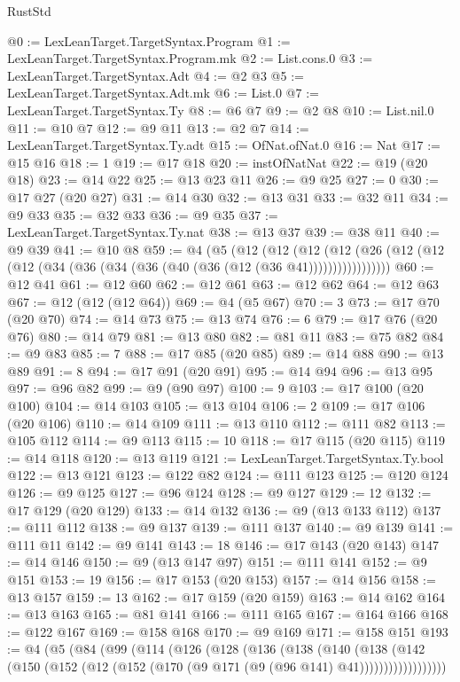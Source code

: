 \begin{lexlean}{RustStd}
\begin{coremodule}
{\begin{coremodule}
{{{{{{{{{{{{{{{{{{{{{{{{{{{{{{{{@0 := LexLeanTarget.TargetSyntax.Program
@1 := LexLeanTarget.TargetSyntax.Program.mk
@2 := List.cons.{0}
@3 := LexLeanTarget.TargetSyntax.Adt
@4 := @2 @3
@5 := LexLeanTarget.TargetSyntax.Adt.mk
@6 := List.{0}
@7 := LexLeanTarget.TargetSyntax.Ty
@8 := @6 @7
@9 := @2 @8
@10 := List.nil.{0}
@11 := @10 @7
@12 := @9 @11
@13 := @2 @7
@14 := LexLeanTarget.TargetSyntax.Ty.adt
@15 := OfNat.ofNat.{0}
@16 := Nat
@17 := @15 @16
@18 := 1
@19 := @17 @18
@20 := instOfNatNat
@22 := @19 (@20 @18)
@23 := @14 @22
@25 := @13 @23 @11
@26 := @9 @25
@27 := 0
@30 := @17 @27 (@20 @27)
@31 := @14 @30
@32 := @13 @31
@33 := @32 @11
@34 := @9 @33
@35 := @32 @33
@36 := @9 @35
@37 := LexLeanTarget.TargetSyntax.Ty.nat
@38 := @13 @37
@39 := @38 @11
@40 := @9 @39
@41 := @10 @8
@59 := @4
    (@5
      (@12
        (@12
          (@12 (@12 (@26 (@12 (@12 (@12 (@34 (@36 (@34 (@36 (@40 (@36 (@12 (@36 @41)))))))))))))))))
@60 := @12 @41
@61 := @12 @60
@62 := @12 @61
@63 := @12 @62
@64 := @12 @63
@67 := @12 (@12 (@12 @64))
@69 := @4 (@5 @67)
@70 := 3
@73 := @17 @70 (@20 @70)
@74 := @14 @73
@75 := @13 @74
@76 := 6
@79 := @17 @76 (@20 @76)
@80 := @14 @79
@81 := @13 @80
@82 := @81 @11
@83 := @75 @82
@84 := @9 @83
@85 := 7
@88 := @17 @85 (@20 @85)
@89 := @14 @88
@90 := @13 @89
@91 := 8
@94 := @17 @91 (@20 @91)
@95 := @14 @94
@96 := @13 @95
@97 := @96 @82
@99 := @9 (@90 @97)
@100 := 9
@103 := @17 @100 (@20 @100)
@104 := @14 @103
@105 := @13 @104
@106 := 2
@109 := @17 @106 (@20 @106)
@110 := @14 @109
@111 := @13 @110
@112 := @111 @82
@113 := @105 @112
@114 := @9 @113
@115 := 10
@118 := @17 @115 (@20 @115)
@119 := @14 @118
@120 := @13 @119
@121 := LexLeanTarget.TargetSyntax.Ty.bool
@122 := @13 @121
@123 := @122 @82
@124 := @111 @123
@125 := @120 @124
@126 := @9 @125
@127 := @96 @124
@128 := @9 @127
@129 := 12
@132 := @17 @129 (@20 @129)
@133 := @14 @132
@136 := @9 (@13 @133 @112)
@137 := @111 @112
@138 := @9 @137
@139 := @111 @137
@140 := @9 @139
@141 := @111 @11
@142 := @9 @141
@143 := 18
@146 := @17 @143 (@20 @143)
@147 := @14 @146
@150 := @9 (@13 @147 @97)
@151 := @111 @141
@152 := @9 @151
@153 := 19
@156 := @17 @153 (@20 @153)
@157 := @14 @156
@158 := @13 @157
@159 := 13
@162 := @17 @159 (@20 @159)
@163 := @14 @162
@164 := @13 @163
@165 := @81 @141
@166 := @111 @165
@167 := @164 @166
@168 := @122 @167
@169 := @158 @168
@170 := @9 @169
@171 := @158 @151
@193 := @4
    (@5
      (@84
        (@99
          (@114
            (@126
              (@128
                (@136
                  (@138
                    (@140
                      (@138
                        (@142
                          (@150 (@152 (@12 (@152 (@170 (@9 @171 (@9 (@96 @141) @41))))))))))))))))))
}}}}}}}}}}}}}}}}}}}}}}}}}}}}}}}}
\end{coremodule}}
\end{coremodule}
\end{lexlean}
